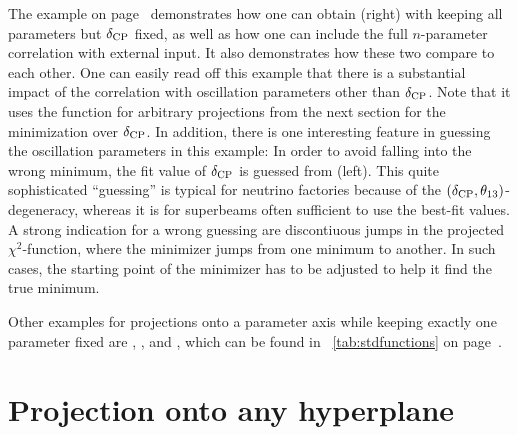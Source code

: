 The example on page~\pageref{ex:corrproj} demonstrates how one can obtain  (right) with keeping all parameters but $\delta_{\mathrm{CP}}$ fixed, as well as how one can include the full $n$-parameter correlation with external input. It also demonstrates how these two compare to each other. One can easily read off this example that 
there is a substantial impact of the
correlation with oscillation parameters other than $\delta_{\mathrm{CP}}$. 
Note that it uses the function
 for arbitrary projections from the next section for the minimization over $\delta_{\mathrm{CP}}$.
In addition, there is one interesting feature in guessing the
oscillation parameters in this example: In order to avoid falling
into the wrong minimum, the fit value of $\delta_{\mathrm{CP}}$ is guessed from  (left). This quite sophisticated ``guessing'' is typical
for neutrino factories because of the $(\delta_{\mathrm{CP}}, \theta_{13})$-degeneracy, whereas it is for superbeams often sufficient
to use the best-fit values. A strong indication for a wrong guessing 
are discontiuous jumps in the projected $\chi^2$-function, where the minimizer jumps from one minimum to another. In such cases, the starting point of the minimizer has to be adjusted to help it find the true minimum.

Other examples for projections onto a parameter axis while keeping exactly one parameter fixed are , , and , which
can be found in \Tab~\ref{tab:stdfunctions} on page~\pageref{tab:stdfunctions}.

\section[Projection onto any hyperplane]{Projection onto any hyperplane}


